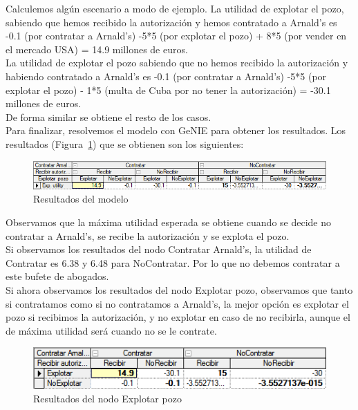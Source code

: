 \documentclass[12pt,a4paper,openright,final]{article}
\begin{document}
Calculemos algún escenario a modo de ejemplo. La utilidad de explotar el pozo, sabiendo que hemos recibido la autorización y hemos contratado a Arnald's es -0.1 (por contratar a Arnald's) -5*5 (por explotar el pozo) + 8*5 (por vender en el mercado USA) = 14.9 millones de euros.\\

La utilidad de explotar el pozo sabiendo que no hemos recibido la autorización y habiendo contratado a Arnald's es -0.1 (por contratar a Arnald's) -5*5 (por explotar el pozo) - 1*5 (multa de Cuba por no tener la autorización) = -30.1 millones de euros.\\

De forma similar se obtiene el resto de los casos.\\

Para finalizar, resolvemos el modelo con GeNIE para obtener los resultados. Los resultados (Figura~\ref{fig:resultado}) que se obtienen son los siguientes:\\

\begin{figure}[tbph!]
	\centering
	\includegraphics[width=\linewidth]{imagenes/resultado.png}
	\caption{Resultados del modelo}
	\label{fig:resultado}
\end{figure}

Observamos que la máxima utilidad esperada se obtiene cuando se decide no contratar a Arnald's, se recibe la autorización y se explota el pozo.\\

Si observamos los resultados del nodo Contratar Arnald's, la utilidad de Contratar es 6.38 y 6.48 para NoContratar. Por lo que no debemos contratar a este bufete de abogados.\\

Si ahora observamos los resultados del nodo Explotar pozo, observamos que tanto si contratamos como si no contratamos a Arnald's, la mejor opción es explotar el pozo si recibimos la autorización, y no explotar en caso de no recibirla, aunque el de máxima utilidad será cuando no se le contrate.\\

\begin{figure}[tbph!]
	\centering
	\includegraphics[width=\linewidth]{imagenes/resultados_pozo.png}
	\caption{Resultados del nodo Explotar pozo}
	\label{fig:resultados_pozo}
\end{figure}
\end{document}
